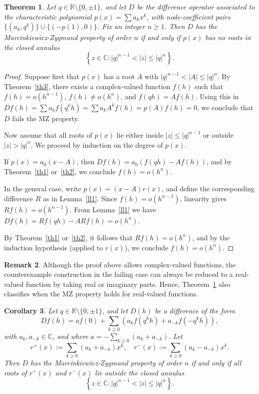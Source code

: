 \documentclass{raex}
\newtheorem{theorem}{Theorem}
\newtheorem{corollary}[theorem]{Corollary}
\theoremstyle{definition}
\newtheorem{remark}[theorem]{Remark}
\begin{document}
\begin{theorem}\label{m}
Let \( q \in \mathbb{R} \setminus \{0, \pm 1\} \), and let \( D \) be the difference operator associated to the characteristic polynomial \( p(x) = \sum a_k x^k \), with node-coefficient pairs \( \{(a_k, q^k)\} \cup \{(-p(1), 0)\} \). Fix an integer \( n \geq 1 \). Then \( D \) has the Marcinkiewicz-Zygmund property of order \( n \) if and only if \( p(x) \) has no roots in the closed annulus
\[
\left\{ z \in \mathbb{C} : |q|^{n-1} < |z| \leq |q|^n \right\}.
\]
\end{theorem}

\begin{proof}
Suppose first that \( p(x) \) has a root \( A \) with \( |q|^{n-1} < |A| \leq |q|^n \). By Theorem~\ref{th3}, there exists a complex-valued function \( f(h) \) such that \( f(h) = o(h^{n-1}) \), \( f(h) \not= o(h^n) \), and \( f(qh) = A f(h) \). Using this in \( Df(h) = \sum a_k f(q^k h) = \sum a_k A^k f(h) = p(A) f(h) = 0 \), we conclude that \( D \) fails the MZ property.

Now assume that all roots of \( p(x) \) lie either inside \( |z| \leq |q|^{n-1} \) or outside \( |z| > |q|^n \). We proceed by induction on the degree of \( p(x) \).

If \( p(x) = a_0(x - A) \), then \( Df(h) = a_0(f(qh) - A f(h)) \), and by Theorem~\ref{th1} or~\ref{th2}, we conclude \( f(h) = o(h^n) \).

In the general case, write \( p(x) = (x - A) r(x) \), and define the corresponding difference \( R \) as in Lemma~\ref{ll1}. Since \( f(h) = o(h^{n-1}) \), linearity gives \( Rf(h) = o(h^{n-1}) \). From Lemma~\ref{ll1} we have \( Df(h) = Rf(qh) - A Rf(h) = o(h^n) \).

By Theorem~\ref{th1} or~\ref{th2}, it follows that \( Rf(h) = o(h^n) \), and by the induction hypothesis (applied to \( r(x) \)), we conclude \( f(h) = o(h^n) \).
\end{proof}

\begin{remark}
Although the proof above allows complex-valued functions, the counterexample construction in the failing case can always be reduced to a real-valued function by taking real or imaginary parts. Hence, Theorem~\ref{m} also classifies when the MZ property holds for real-valued functions.
\end{remark}

\begin{corollary}\label{cor:symmetric-geo}
Let \( q \in \mathbb{R} \setminus \{0, \pm 1\} \), and let \( D(h) \) be a difference of the form
\[
Df(h) = a f(0) + \sum_{k \geq 0} \left( a_k f(q^k h) + a_{-k} f(-q^k h) \right),
\]
with \( a_k, a_{-k} \in \mathbb{C} \), and where \( a = -\sum_{k \geq 0} (a_k + a_{-k}) \). Let
\[
r^+(x) := \sum_{k \geq 0} (a_k + a_{-k}) x^k, \quad r^-(x) := \sum_{k \geq 0} (a_k - a_{-k}) x^k.
\]
Then \( D \) has the Marcinkiewicz-Zygmund property of order \( n \) if and only if all roots of \( r^+(x) \) and \( r^-(x) \) lie outside the closed annulus
\[
\left\{ z \in \mathbb{C} : |q|^{n-1} < |z| \leq |q|^n \right\}.
\]
\end{corollary}
\end{document}
